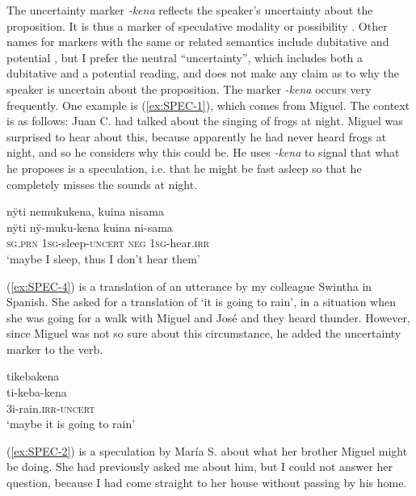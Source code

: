The uncertainty marker \textit{-kena} reflects the speaker’s uncertainty about the proposition. It is thus a marker of speculative modality \citep[24--25]{Palmer2001} or possibility \citep[179]{Bybee_et_al1994}. Other names for markers with the same or related semantics include dubitative \citep[141]{Mueller2013} and potential \citep[149]{Mueller2013}, but I prefer the neutral “uncertainty”, which includes both a dubitative and a potential reading, and does not make any claim as to why the speaker is uncertain about the proposition. The marker \textit{-kena} occurs very frequently. One example is (\ref{ex:SPEC-1}), which comes from Miguel. %
The context is as follows: Juan C. had talked about the singing of frogs at night. Miguel was surprised to hear about this, because apparently he had never heard frogs at night, and so he considers why this could be. He uses \textit{-kena} to signal that what he proposes is a speculation, i.e. that he might be fast asleep so that he completely misses the sounds at night.

\ea\label{ex:SPEC-1}
\begingl 
\glpreamble nÿti nemukukena, kuina nisama\\
\gla nÿti nÿ-muku-kena kuina ni-sama\\ 
\textsc{sg.prn} 1\textsc{sg}-sleep-\textsc{uncert} \textsc{neg} 1\textsc{sg}-hear.\textsc{irr}\\ 
\glft ‘maybe I sleep, thus I don’t hear them’
\trailingcitation{[mqx-p110826l.622]}
\xe

(\ref{ex:SPEC-4}) is a translation of an utterance by my colleague Swintha in Spanish. She asked for a translation of ‘it is going to rain’, in a situation when she was going for a walk with Miguel and José and they heard thunder. However, since Miguel was not so sure about this circumstance, he added the uncertainty marker to the verb.

\ea\label{ex:SPEC-4}
\begingl 
\glpreamble tikebakena\\
\gla ti-keba-kena\\ 
\glb 3i-rain.\textsc{irr}-\textsc{uncert}\\ 
\glft ‘maybe it is going to rain’
\trailingcitation{[mox-c110926s-1.182]}%
\xe

(\ref{ex:SPEC-2}) is a speculation by María S. about what her brother Miguel might be doing. She had previously asked me about him, but I could not answer her question, because I had come straight to her house without passing by his home. 

